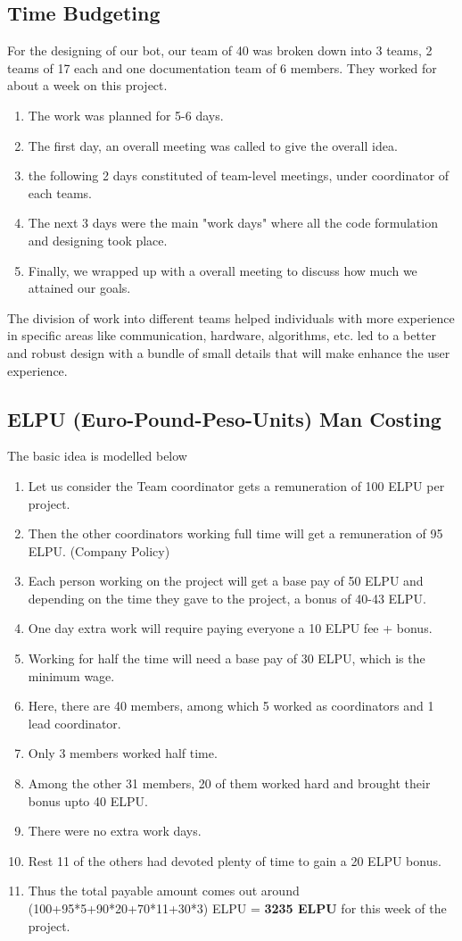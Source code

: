 \documentclass{article}
\begin{document}
\subsection{Time Budgeting}
For the designing of our bot, our team of 40 was broken down into 3 teams, 2 teams of 17 each and one documentation team of 6 members. They worked for about a week on this project.
\begin{enumerate}
    \item The work was planned for 5-6 days.
    \item The first day, an overall meeting was called to give the overall idea.
    \item the following 2 days constituted of team-level meetings, under coordinator of each teams.
    \item The next 3 days were the main "work days" where all the code formulation and designing took place.
    \item Finally, we wrapped up with a overall meeting to discuss how much we attained our goals.
\end{enumerate}

The division of work into different teams helped individuals with more experience in specific areas like communication, hardware, algorithms, etc. led to a better and robust design with a bundle of small details that will make enhance the user experience.
\subsection{ELPU (Euro-Pound-Peso-Units) Man Costing}
The basic idea is modelled below
\begin{enumerate}
    \item Let us consider the Team coordinator gets a remuneration of 100 ELPU per project.
    \item Then the other coordinators working full time will get a remuneration of 95 ELPU. (Company Policy)
    \item Each person working on the project will get a base pay of 50 ELPU and depending on the time they gave to the project, a bonus of 40-43 ELPU.
    \item One day extra work will require paying everyone a 10 ELPU fee + bonus.
    \item Working for half the time will need a base pay of 30 ELPU, which is the minimum wage.
    \item Here, there are 40 members, among which 5 worked as coordinators and 1 lead coordinator.
    \item Only 3 members worked half time.
    \item Among the other 31 members, 20 of them worked hard and brought their bonus upto 40 ELPU.
    \item There were no extra work days.
    \item Rest 11 of the others had devoted plenty of time to gain a 20 ELPU bonus.
    \item Thus the total payable amount comes out around (100+95*5+90*20+70*11+30*3) ELPU = \textbf{3235 ELPU} for this week of the project.
\end{enumerate}
\end{document}
